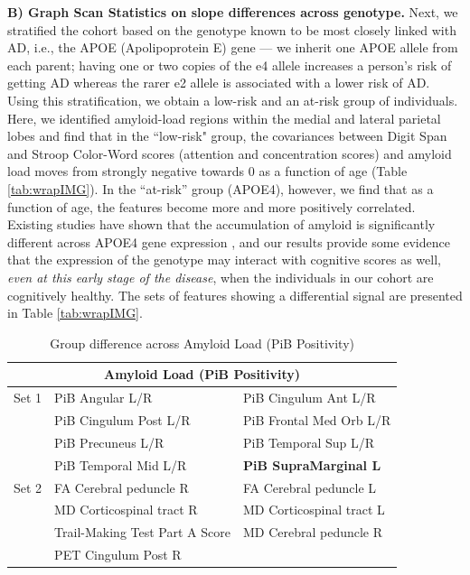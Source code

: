 {\bf B) Graph Scan Statistics on slope differences across genotype.} 
Next, we stratified the cohort
 based on the genotype known to be most closely linked with AD, i.e., the APOE (Apolipoprotein E) gene \cite{corder1993gene} --- 
we inherit one APOE allele from each parent; having one or two copies of the e4 allele increases a person's risk of getting AD 
whereas the rarer e2 allele is associated with a lower risk of AD. 
Using this stratification, we obtain a low-risk and an at-risk group of individuals. 
Here, we identified amyloid-load regions within the medial and lateral parietal lobes 
and find that in the ``low-risk" group, the covariances between Digit Span and Stroop Color-Word scores 
(attention and concentration scores) and amyloid load moves from strongly negative towards $0$ as a function of age (Table \ref{tab:wrapIMG}). 
In the ``at-risk'' group 
(APOE4), however, we find that as a function of age, the features become more and more positively correlated. 
Existing studies have shown that the accumulation 
of amyloid is significantly different across APOE4 gene expression \cite{mormino2014amyloid}, and our results provide some evidence 
that the expression of the genotype may interact with cognitive scores as well, {\em even at this early stage of the disease}, 
when the individuals in our cohort are 
cognitively healthy. The sets of features showing a differential signal are presented in Table \ref{tab:wrapIMG}.
%

\begin{table}[]
	\small
	\centering
	\begin{tabular}{lll}
		\toprule
		\multicolumn{3}{c}{\textbf{Amyloid Load (PiB Positivity)}}\\ \midrule \midrule
		Set 1 & PiB Angular L/R & PiB Cingulum Ant L/R \\
		& PiB Cingulum Post L/R & PiB Frontal Med Orb L/R \\
		& PiB Precuneus L/R & PiB Temporal Sup L/R \\
		& PiB Temporal Mid L/R & \textbf{PiB SupraMarginal L} \\
		\midrule
		Set 2     & FA Cerebral peduncle R   & FA Cerebral peduncle L	\\
		& MD Corticospinal tract R	& MD Corticospinal tract L		\\
		& Trail-Making Test Part A Score  & MD Cerebral peduncle R \\ 
		&PET Cingulum Post R  &  \\ \midrule\bottomrule
	\end{tabular}
	\caption{Group difference across Amyloid Load (PiB Positivity)}
	\label{tab:wrapPIB}
\end{table}

